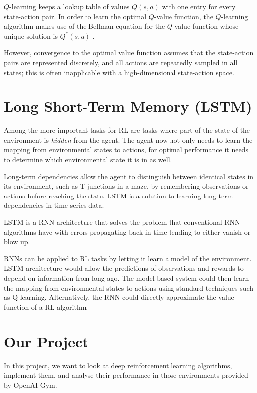 \documentclass{article}
\begin{document}
$Q$-learning keeps a lookup table of values $Q(s,a)$ with one entry for every state-action pair. In order to learn the optimal $Q$-value function, the $Q$-learning algorithm makes use of the Bellman equation for the $Q$-value function whose unique solution is $Q^*(s,a)$ \cite{DBLP:journals/corr/abs-1811-12560}.

However, convergence to the optimal value function assumes that the state-action pairs are represented discretely, and all actions are repeatedly sampled in all states; this is often inapplicable with a high-dimensional state-action space.

\section{Long Short-Term Memory (LSTM) \cite{RLLSTM}}

Among the more important tasks for RL are tasks where part of the state of the environment is \textit{hidden} from the agent. The agent now not only needs to learn the mapping from environmental states to actions, for optimal performance it needs to determine which environmental state it is in as well.

Long-term dependencies allow the agent to distinguish between identical states in its environment, such as T-junctions in a maze, by remembering observations or actions before reaching the state. LSTM is a solution to learning long-term dependencies in time series data.

LSTM is a RNN architecture that solves the problem that conventional RNN algorithms have with errors propagating back in time tending to either vanish or blow up.

RNNs can be applied to RL tasks by letting it learn a model of the environment. LSTM architecture would allow the predictions of observations and rewards to depend on information from long ago. The model-based system could then learn the mapping from environmental states to actions using standard techniques such as Q-learning. Alternatively, the RNN could directly approximate the value function of a RL algorithm.

\section{Our Project}

In this project, we want to look at deep reinforcement learning algorithms, implement them, and analyse their performance in those environments provided by OpenAI Gym.

\printbibliography
\end{document}
